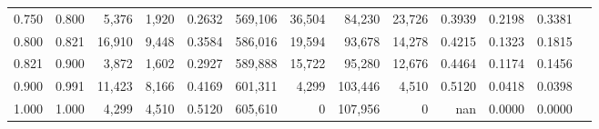 \begin{tabular}{rrrrrrrrrrrrr}
0.750 & 0.800 &  5,376 &  1,920 &                                     0.2632 & 569,106 &  36,504 &  84,230 &  23,726 & 0.3939 & 0.2198 & 0.3381 \\
0.800 & 0.821 & 16,910 &  9,448 &                                     0.3584 & 586,016 &  19,594 &  93,678 &  14,278 & 0.4215 & 0.1323 & 0.1815 \\
0.821 & 0.900 &  3,872 &  1,602 &                                     0.2927 & 589,888 &  15,722 &  95,280 &  12,676 & 0.4464 & 0.1174 & 0.1456 \\
0.900 & 0.991 & 11,423 &  8,166 &                                     0.4169 & 601,311 &   4,299 & 103,446 &   4,510 & 0.5120 & 0.0418 & 0.0398 \\
1.000 & 1.000 &  4,299 &  4,510 &                                     0.5120 & 605,610 &       0 & 107,956 &       0 &    nan & 0.0000 & 0.0000 \\
\bottomrule
\end{tabular}
